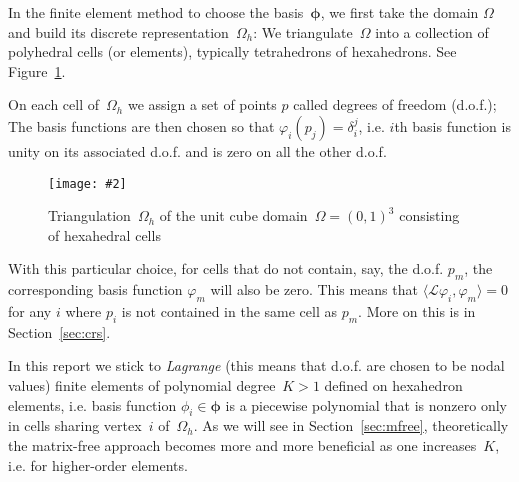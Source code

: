 \documentclass[12pt]{article}
\newcommand{\includegraphicsw}[2][1.]{\texttt{[image: \#2]}}
\newcommand{\vect}[1]{\boldsymbol{\mathbf{#1}}}
\newcommand{\AZ}[1]{{\color{red}\textbf{AZ}:~#1}}
\begin{document}
In the finite element method to choose the basis~$\vect\phi$, we first take the domain $\Omega$ and build its discrete representation~$\Omega_h$: We triangulate~$\Omega$ into a collection of polyhedral cells (or elements), typically tetrahedrons of hexahedrons. See Figure~\ref{fig:mesh}.

%

On each cell of~$\Omega_h$ we assign a set of points $p$ called degrees of freedom (d.o.f.); The basis functions are then chosen so that $\varphi_{i}(p_{j}) = \delta_{i}^{j}$, i.e. $i$th basis function is unity on its associated d.o.f. and is zero on all the other d.o.f. %

\begin{figure}[H]
	\centering
	\includegraphicsw[.4]{mesh.png}
	\caption{Triangulation~$\Omega_h$ of the unit cube domain~$\Omega = (0, 1)^{3}$ consisting of hexahedral cells}\label{fig:mesh}
\end{figure}

With this particular choice, for cells that do not contain, say, the d.o.f. $p_{m}$, the corresponding basis function $\varphi_{m}$ will also be zero. This means that $\langle \mathcal{L}\varphi_{i}, \varphi_{m}\rangle = 0$ for any $i$ where $p_{i}$ is not contained in the same cell as $p_{m}$. More on this is in Section~\ref{sec:crs}.

In this report we stick to \textit{Lagrange} (this means that d.o.f. are chosen to be nodal values) finite elements of polynomial degree~$K > 1$ defined on hexahedron elements, i.e. basis function $\phi_i \in \vect\phi$ is a piecewise polynomial that is nonzero only in cells sharing vertex~$i$ of~$\Omega_h$. As we will see in Section~\ref{sec:mfree}, theoretically the matrix-free approach becomes more and more beneficial as one increases~$K$, i.e. for higher-order elements. 
\end{document}

